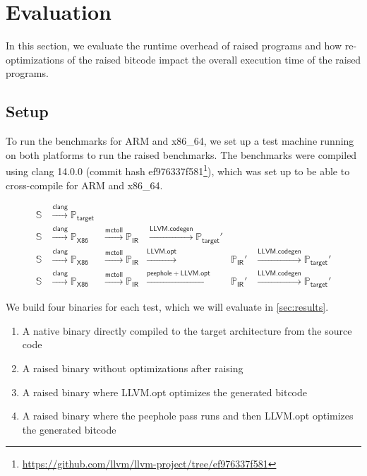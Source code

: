 

\chapter{Evaluation}\label{ch:evaluation}

In this section, we evaluate the runtime overhead of raised programs and how re-optimizations of the raised bitcode impact the overall execution time of the raised programs.

\section{Setup}\label{sec:setup}

To run the benchmarks for ARM and x86\_64, we set up a test machine running on both platforms to run the raised benchmarks.
The benchmarks were compiled using clang 14.0.0 (commit hash ef976337f581\footnote{\url{https://github.com/llvm/llvm-project/tree/ef976337f581}}), which was set up to be able to cross-compile for ARM and x86\_64.

\begin{align}
    \mathbb{S}
    &\xrightarrow{\mathsf{clang}} \mathbb{P}_\mathsf{target} \\
    \mathbb{S}
    &\xrightarrow{\mathsf{clang}} \mathbb{P}_\mathsf{X86}
    &\xrightarrow{\mathsf{mctoll}} \mathbb{P}_\mathsf{IR}
    &\xrightarrow{\mathsf{LLVM.codegen}} \mathbb{P}_\mathsf{target}' \\
    \mathbb{S}
    &\xrightarrow{\mathsf{clang}} \mathbb{P}_\mathsf{X86}
    &\xrightarrow{\mathsf{mctoll}} \mathbb{P}_\mathsf{IR}
    &\xrightarrow{\mathsf{LLVM.opt}} &\mathbb{P}_\mathsf{IR}'
    &\xrightarrow{\mathsf{LLVM.codegen}} \mathbb{P}_\mathsf{target}' \\
    \mathbb{S}
    &\xrightarrow{\mathsf{clang}} \mathbb{P}_\mathsf{X86}
    &\xrightarrow{\mathsf{mctoll}} \mathbb{P}_\mathsf{IR}
    &\xrightarrow{\mathsf{peephole + LLVM.opt}} &\mathbb{P}_\mathsf{IR}'
    &\xrightarrow{\mathsf{LLVM.codegen}} \mathbb{P}_\mathsf{target}'
    \label{eq:test-setup}
\end{align}

We build four binaries for each test, which we will evaluate in \cref{sec:results}.
\begin{enumerate}
    \item A native binary directly compiled to the target architecture from the source code
    \item A raised binary without optimizations after raising
    \item A raised binary where LLVM.opt optimizes the generated bitcode
    \item A raised binary where the peephole pass runs and then LLVM.opt optimizes the generated bitcode
\end{enumerate}

